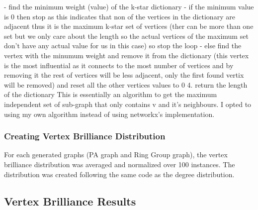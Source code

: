 \documentclass[11pt,a4paper,notitlepage]{article}
\begin{document}
            - find the minimum weight (value) of the k-star dictionary 
            - if the minimum value is 0 then stop as this indicates that non of the vertices in the dictionary are adjacent thus it is the maximum k-star set of vertices (ther can be more than one set but we only care about the length so the actual vertices of the maximum set don't have any actual value for us in this case) so stop the loop
            - else find the vertex with the minumum weight and remove it from the dictionary (this vertex is the most influential as it connects to the most number of vertices and by removing it the rest of vertices will be less adjacent, only the first found vertix will be removed) and reset all the other vertices values to 0 
    4. return the length of the dictionary 
This is essentially an algorithm to get the maximum independent set of sub-graph that only contains v and it's neighbours. I opted to using my own algorithm instead of using networkx's implementation. 
\subsubsection*{Creating Vertex Brilliance Distribution}
For each generated graphs (PA graph and Ring Group graph), the vertex brilliance distribution was averaged and normalized over 100 instances. The distribution was created following the same code as the degree distribution.

\subsection*{Vertex Brilliance Results}
\end{document}
